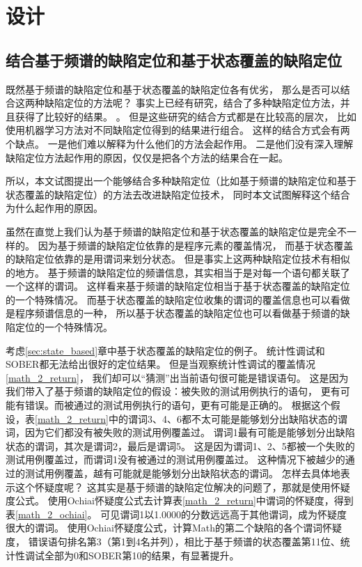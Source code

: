 \chapter{设计}

\section{结合基于频谱的缺陷定位和基于状态覆盖的缺陷定位}

既然基于频谱的缺陷定位和基于状态覆盖的缺陷定位各有优劣，
那么是否可以结合这两种缺陷定位的方法呢？
事实上已经有研究\parencite{Le2016A,Xuan2014Learning}，结合了多种缺陷定位方法，并且获得了比较好的结果。
。
但是这些研究的结合方式都是在比较高的层次，
比如使用机器学习方法对不同缺陷定位得到的结果进行组合。
这样的结合方式会有两个缺点。
一是他们难以解释为什么他们的方法会起作用。
二是他们没有深入理解缺陷定位方法起作用的原因，仅仅是把各个方法的结果合在一起。

所以，本文试图提出一个能够结合多种缺陷定位（比如基于频谱的缺陷定位和基于状态覆盖的缺陷定位）的方法去改进缺陷定位技术，
同时本文试图解释这个结合为什么起作用的原因。

虽然在直觉上我们认为基于频谱的缺陷定位和基于状态覆盖的缺陷定位是完全不一样的。
因为基于频谱的缺陷定位依靠的是程序元素的覆盖情况，
而基于状态覆盖的缺陷定位依靠的是用谓词来划分状态。
但是事实上这两种缺陷定位技术有相似的地方。
基于频谱的缺陷定位的频谱信息，其实相当于是对每一个语句都关联了一个这样的谓词。
这样看来基于频谱的缺陷定位相当于基于状态覆盖的缺陷定位的一个特殊情况。
而基于状态覆盖的缺陷定位收集的谓词的覆盖信息也可以看做是程序频谱信息的一种，
所以基于状态覆盖的缺陷定位也可以看做基于频谱的缺陷定位的一个特殊情况。

考虑\ref{sec:state_based}章中基于状态覆盖的缺陷定位的例子。
统计性调试和SOBER都无法给出很好的定位结果。
但是当观察统计性调试的覆盖情况\ref{math_2_return}，
我们却可以“猜测”出当前语句很可能是错误语句。
这是因为我们带入了基于频谱的缺陷定位的假设：被失败的测试用例执行的语句，
更有可能有错误。而被通过的测试用例执行的语句，更有可能是正确的。
根据这个假设，表\ref{math_2_return}中的谓词3、4、6都不太可能是能够划分出缺陷状态的谓词，因为它们都没有被失败的测试用例覆盖过。
谓词1最有可能是能够划分出缺陷状态的谓词，其次是谓词2，最后是谓词5。
这是因为谓词1、2、5都被一个失败的测试用例覆盖过，而谓词1没有被通过的测试用例覆盖过。
这种情况下被越少的通过的测试用例覆盖，越有可能就是能够划分出缺陷状态的谓词。
怎样去具体地表示这个怀疑度呢？
这其实是基于频谱的缺陷定位解决的问题了，那就是使用怀疑度公式。
使用Ochiai怀疑度公式去计算表\ref{math_2_return}中谓词的怀疑度，得到表\ref{math_2_ochiai}。
可见谓词1以1.0000的分数远远高于其他谓词，成为怀疑度很大的谓词。
使用Ochiai怀疑度公式，计算Math的第二个缺陷的各个谓词怀疑度，
错误语句排名第3（第1到4名并列），相比于基于频谱的状态覆盖第11位、统计性调试全部为0和SOBER第10的结果，有显著提升。

